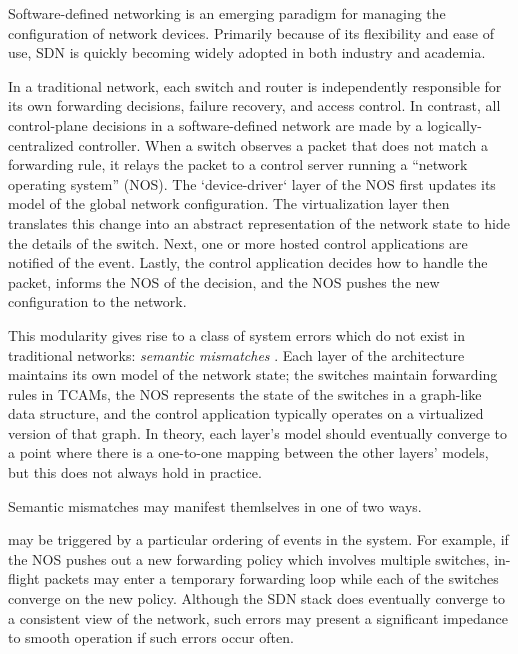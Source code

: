 Software-defined networking is an emerging paradigm for managing the
configuration of network devices. Primarily because of its flexibility and ease of use, SDN is
quickly becoming widely adopted in both industry and academia. 

In a traditional network, each switch and router is independently responsible for
its own forwarding decisions, failure recovery, and access control. In
contrast, all control-plane decisions in a software-defined network are made by
a logically-centralized controller. When a
switch observes a packet that does not match a forwarding rule, 
it relays the packet to a control server running a ``network operating system''
(NOS). The `device-driver` layer of the NOS first updates its model of the global network configuration.
The virtualization layer then translates this change into an abstract 
representation of the network state to hide the details of the switch. Next, one or more hosted control
applications are notified of the event. Lastly, the
control application decides how to handle the packet, informs the NOS of the decision,
and the NOS pushes the new configuration to the network.


This modularity gives rise to a class of system errors which do not exist in
traditional networks: {\it semantic mismatches} . Each layer of the architecture
maintains its own model of the network state; the switches maintain forwarding
rules in TCAMs, the NOS represents the state of the switches in a graph-like data
structure, and the control application typically operates on 
a virtualized version of that graph. In theory, each layer's model should eventually
converge to a point where there is a one-to-one mapping 
between the other layers' models, but this does not always hold in practice.

Semantic mismatches may manifest themlselves in one of two ways.

 may be triggered by a particular ordering of
events in the system. For example, if the NOS pushes out a new forwarding policy
which involves multiple switches, in-flight packets may enter a
temporary forwarding loop while each of the switches converge on the new policy.
 Although the SDN stack does eventually converge to
a consistent view of the network, such errors may present a significant
impedance to smooth operation if such errors occur often. 

